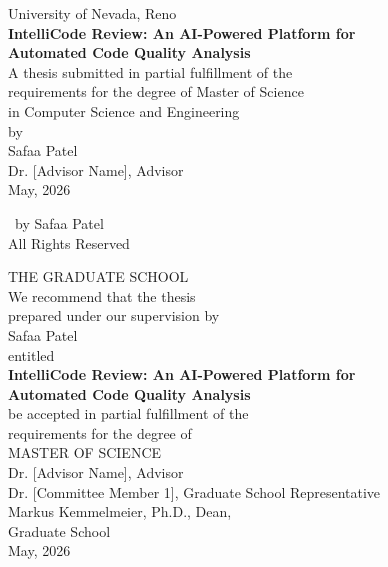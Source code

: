 \documentclass[12pt, oneside]{report}
\begin{document}
\begin{titlepage}
\begin{center}
\vspace*{1in}
{\Large University of Nevada, Reno}\\[0.5em]
\vspace{1in}
{\LARGE\bfseries IntelliCode Review: An AI-Powered Platform for\\[0.3em]
Automated Code Quality Analysis}\\[1.5in]
{\large A thesis submitted in partial fulfillment of the\\
requirements for the degree of Master of Science\\
in Computer Science and Engineering}\\[1in]
{\large by}\\[0.5em]
{\Large Safaa Patel}\\[1in]
{\large Dr. [Advisor Name], Advisor}\\[1.5in]
{\large May, 2026}
\end{center}
\end{titlepage}

\newpage
\thispagestyle{empty}
\vspace*{\fill}
\begin{center}
\textcopyright\ by Safaa Patel\\
All Rights Reserved
\end{center}
\vspace*{\fill}

\newpage
\thispagestyle{empty}
\begin{center}
{\large THE GRADUATE SCHOOL}\\[1em]
We recommend that the thesis\\
prepared under our supervision by\\[1em]
{\large Safaa Patel}\\[1em]
entitled\\[1em]
{\large\bfseries IntelliCode Review: An AI-Powered Platform for\\
Automated Code Quality Analysis}\\[1em]
be accepted in partial fulfillment of the\\
requirements for the degree of\\[1em]
{\large MASTER OF SCIENCE}\\[2em]
Dr. [Advisor Name], Advisor\\[1.5em]
Dr. [Committee Member 1], Graduate School Representative\\[1.5em]
Markus Kemmelmeier, Ph.D., Dean,\\
Graduate School\\[1.5em]
May, 2026
\end{center}
\end{document}
